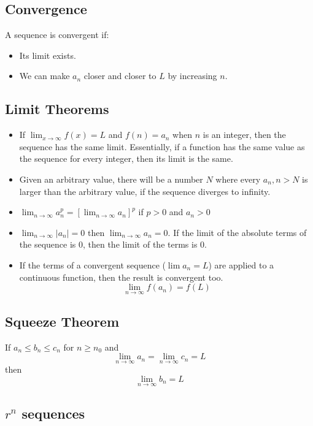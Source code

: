 \documentclass[12pt]{article}
\begin{document}
\subsection{Convergence}

A sequence is convergent if:
\begin{itemize}
\item Its limit exists.
\item We can make $a_n$ closer and closer to $L$ by increasing $n$.
\end{itemize}


\subsection{Limit Theorems}

\begin{itemize}
\item If $\lim_{x\to\infty} f(x) = L$ and $f(n) = a_n$ when $n$ is an integer, then the sequence has the same limit.
    Essentially, if a function has the same value as the sequence for every integer, then its limit is the same.
\item Given an arbitrary value, there will be a number $N$ where every $a_n, n > N$ is larger than the arbitrary value, if the sequence diverges to infinity.
\item $\lim_{n\to\infty} a_n^p = \left[\lim_{n\to\infty} a_n\right]^p$ if $p > 0$ and $a_n > 0$
\item $\lim_{n\to\infty} \left|a_n\right| = 0$ then $\lim_{n\to\infty} a_n = 0$. If the limit of the absolute terms of the sequence is 0, then the limit of the terms is 0.
\item If the terms of a convergent sequence ($\lim a_n = L$) are applied to a continuous function, then the result is convergent too. $$\lim_{n\to\infty} f(a_n) = f(L)$$
\end{itemize}


\subsection{Squeeze Theorem}

If $a_n \leq b_n \leq c_n$ for $n \geq n_0$ and
$$\lim_{n\to\infty} a_n = \lim_{n\to\infty} c_n = L$$
then
$$\lim_{n\to\infty} b_n = L$$


\subsection{${r^n}$ sequences}
\end{document}
